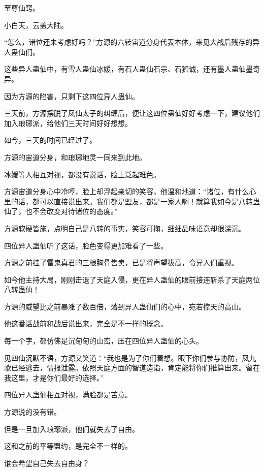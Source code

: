 
\begin{this_body}

至尊仙窍。

小白天，云盖大陆。

“怎么，诸位还未考虑好吗？”方源的六转宙道分身代表本体，来见大战后残存的异人蛊仙们。

这些异人蛊仙中，有雪人蛊仙冰媛，有石人蛊仙石宗、石狮诚，还有墨人蛊仙墨奇异。

因为方源的陷害，只剩下这四位异人蛊仙。

三天前，方源摆脱了凤仙太子的纠缠后，便让这四位蛊仙好好考虑一下，建议他们加入琅琊派，给他们三天时间好好想想。

如今，三天的时间已经过了。

方源的宙道分身，和琅琊地灵一同来到此地。

冰媛等人相互对视，都没有说话，脸上泛起难色。

方源宙道分身心中冷哼，脸上却浮起亲切的笑容，他温和地道：“诸位，有什么心里的话，都可以直接说出来。我们都是盟友，都是一家人啊！就算我如今是八转蛊仙了，也不会改变对待诸位的态度。”

方源软硬皆施，点明自己是八转的事实，笑容可掬，细细品味语意却很深沉。

四位异人蛊仙听了这话，脸色变得更加难看了一些。

方源之前挂了雷鬼真君的三根胸骨售卖，已是将声望拔高，令异人们重视。

如今他主持大局，刚刚击退了天庭入侵，更在异人蛊仙的眼前接连斩杀了天庭两位八转蛊仙！

方源的威望比之前暴涨了数百倍，落到异人蛊仙们的心中，宛若撑天的高山。

他这番话战前和战后说出来，完全是不一样的概念。

每一个字，都仿佛是沉甸甸的山峦，压在四位异人蛊仙的心头。

见四仙沉默不语，方源又笑道：“我也是为了你们着想。眼下你们参与协防，凤九歌已经逃去，情报泄露。依照天庭方面的智道造诣，肯定能将你们推算出来。留在我这里，才是你们最好的选择。”

四位异人蛊仙相互对视，满脸都是苦意。

方源说的没有错。

但是一旦加入琅琊派，他们就失去了自由。

这和之前的平等盟约，是完全不一样的。

谁会希望自己失去自由身？


\end{this_body}
